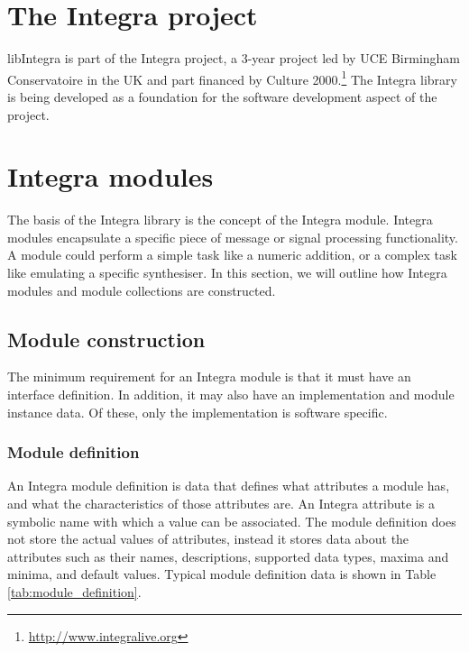 
\section{The Integra project}\label{sec:introduction}

libIntegra is part of the Integra project, a 3-year project led by UCE Birmingham Conservatoire in the UK and part financed by Culture 2000.\footnote{\url{http://www.integralive.org}} The Integra library is being developed as a foundation for the software development aspect of the project. 

\section{Integra modules}\label{sec:modules}

The basis of the Integra library is the concept of the Integra module. Integra modules encapsulate a specific piece of message or signal processing functionality. A module could perform a simple task like a numeric addition, or a complex task like emulating a specific synthesiser. In this section, we will outline how Integra modules and module collections are constructed.

\subsection{Module construction}\label{subsec:module_construction}

The minimum requirement for an Integra module is that it must have an interface definition. In addition, it may also have an implementation and module instance data. Of these, only the implementation is software specific.

\subsubsection{Module definition}\label{subsubsec:module_definition}

An Integra module definition is data that defines what attributes a
module has, and what the characteristics of those attributes are. An
Integra attribute is a symbolic name with which a value can be
associated. The module definition does not store the actual values of
attributes, instead it stores data about the attributes such as their
names, descriptions, supported data types, maxima and minima, and
default values. Typical module definition data is shown in Table
\ref{tab:module_definition}.

